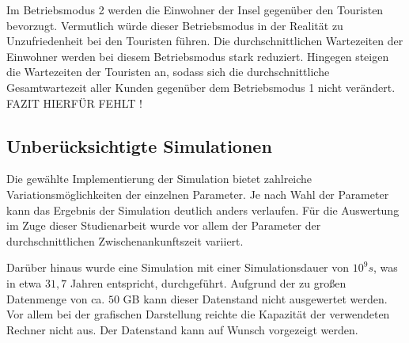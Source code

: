 Im Betriebsmodus 2 werden die Einwohner der Insel gegenüber den Touristen bevorzugt. Vermutlich würde dieser Betriebsmodus in der Realität zu Unzufriedenheit bei den Touristen führen. Die durchschnittlichen Wartezeiten der Einwohner werden bei diesem Betriebsmodus stark reduziert. Hingegen steigen die Wartezeiten der Touristen an, sodass sich die durchschnittliche Gesamtwartezeit aller Kunden gegenüber dem Betriebsmodus 1 nicht verändert. \\
FAZIT HIERFÜR FEHLT !


\subsection{Unberücksichtigte Simulationen}
Die gewählte Implementierung der Simulation bietet zahlreiche Variationsmöglichkeiten der einzelnen Parameter. Je nach Wahl der Parameter kann das Ergebnis der Simulation deutlich anders verlaufen. Für die Auswertung im Zuge dieser Studienarbeit wurde vor allem der Parameter der durchschnittlichen Zwischenankunftszeit variiert. 

Darüber hinaus wurde eine Simulation mit einer Simulationsdauer von $10^9s$, was in etwa $31,7$ Jahren entspricht, durchgeführt. Aufgrund der zu großen Datenmenge von ca. $50$ GB kann dieser Datenstand nicht ausgewertet werden. Vor allem bei der grafischen Darstellung reichte die Kapazität der verwendeten Rechner nicht aus. Der Datenstand kann auf Wunsch vorgezeigt werden.



%
 


